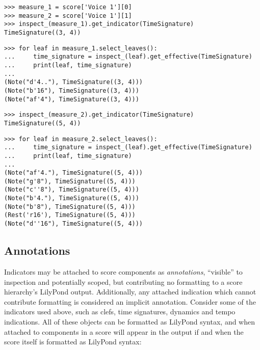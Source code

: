 \begin{abjadbookoutput}
\begin{singlespacing}
\vspace{-0.5\baselineskip}
\begin{verbatim}
>>> measure_1 = score['Voice 1'][0]
>>> measure_2 = score['Voice 1'][1]
>>> inspect_(measure_1).get_indicator(TimeSignature)
TimeSignature((3, 4))
\end{verbatim}
\begin{verbatim}
>>> for leaf in measure_1.select_leaves():
...     time_signature = inspect_(leaf).get_effective(TimeSignature)
...     print(leaf, time_signature)
...
(Note("d'4.."), TimeSignature((3, 4)))
(Note("b'16"), TimeSignature((3, 4)))
(Note("af'4"), TimeSignature((3, 4)))
\end{verbatim}
\begin{verbatim}
>>> inspect_(measure_2).get_indicator(TimeSignature)
TimeSignature((5, 4))
\end{verbatim}
\begin{verbatim}
>>> for leaf in measure_2.select_leaves():
...     time_signature = inspect_(leaf).get_effective(TimeSignature)
...     print(leaf, time_signature)
...
(Note("af'4."), TimeSignature((5, 4)))
(Note("g'8"), TimeSignature((5, 4)))
(Note("c''8"), TimeSignature((5, 4)))
(Note("b'4."), TimeSignature((5, 4)))
(Note("b'8"), TimeSignature((5, 4)))
(Rest('r16'), TimeSignature((5, 4)))
(Note("d''16"), TimeSignature((5, 4)))
\end{verbatim}
\end{singlespacing}
\end{abjadbookoutput}

\subsection{Annotations}
\label{ssec:annotations}

Indicators may be attached to score components as \emph{annotations},
\enquote{visible} to inspection and potentially scoped, but contributing no
formatting to a score hierarchy's LilyPond output. Additionally, any attached
indication which cannot contribute formatting is considered an implicit
annotation. Consider some of the indicators used above, such as clefs, time
signatures, dynamics and tempo indications. All of these objects can be
formatted as LilyPond syntax, and when attached to components in a score will
appear in the output if and when the score itself is formatted as LilyPond
syntax:


